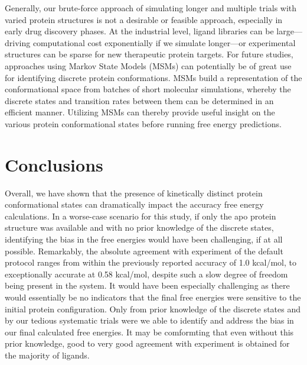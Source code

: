 \documentclass[journal=jctcce,manuscript=article]{achemso}
\begin{document}
Generally, our brute-force approach of simulating longer and multiple trials with varied protein structures is not a desirable or feasible approach, especially in early drug discovery phases.
At the industrial level, ligand libraries can be large---driving computational cost exponentially if we simulate longer---or experimental structures can be sparse for new therapeutic protein targets.
For future studies, approaches using Markov State Models (MSMs)\cite{MSM} can potentially be of great use for identifying discrete protein conformations.
MSMs build a representation of the conformational space from batches of short molecular simulations, whereby the discrete states and transition rates between them can be determined in an efficient manner.
Utilizing MSMs can thereby provide useful insight on the various protein conformational states before running free energy predictions.

\section{Conclusions}
Overall, we have shown that the presence of kinetically distinct protein conformational states can dramatically impact the accuracy free energy calculations.
In a worse-case scenario for this study, if only the apo protein structure was available and with no prior knowledge of the discrete states, identifying the bias in the free energies would have been challenging, if at all possible.
Remarkably, the absolute agreement with experiment of the default protocol ranges from within the previously reported accuracy of 1.0 kcal/mol, to exceptionally accurate at 0.58 kcal/mol, despite such a slow degree of freedom being present in the system.
It would have been especially challenging as there would essentially be no indicators that the final free energies were sensitive to the initial protein configuration.
Only from prior knowledge of the discrete states and by our tedious systematic trials were we able to identify and address the bias in our final calculated free energies.  
It may be comformting that even without this prior knowledge, good to very good agreement with experiment is obtained for the majority of ligands. 

\end{document}

